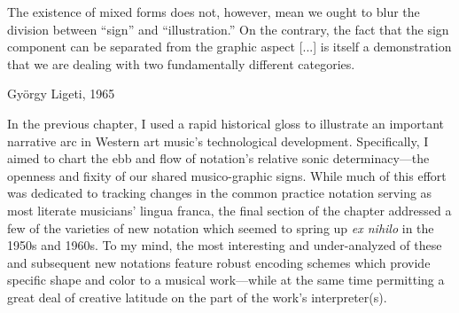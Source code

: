 

\singlespacing

\epigraph{The existence of mixed forms does not, however, mean we ought to blur the division between ``sign'' and ``illustration.'' On the contrary, the fact that the sign component can be separated from the graphic aspect [...] is itself a demonstration that we are dealing with two fundamentally different categories.}{György Ligeti, 1965}

\doublespacing



    In the previous chapter, I used a rapid historical gloss to illustrate an important narrative arc in Western art music's technological development. Specifically, I aimed to chart the ebb and flow of notation's relative sonic determinacy---the openness and fixity of our shared musico-graphic signs. While much of this effort was dedicated to tracking changes in the common practice notation serving as most literate musicians' lingua franca, the final section of the chapter addressed a few of the varieties of new notation which seemed to spring up \textit{ex nihilo} in the 1950s and 1960s. To my mind, the most interesting and under-analyzed of these and subsequent new notations feature robust encoding schemes which provide specific shape and color to a musical work---while at the same time permitting a great deal of creative latitude on the part of the work's interpreter(s).
    
